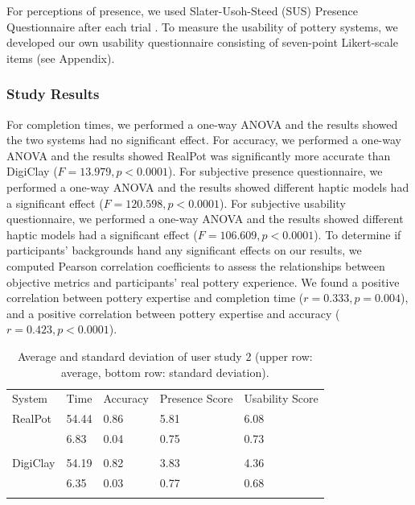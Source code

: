 \documentclass{svjour3}                     %
\begin{document}
{For perceptions of presence, we used Slater-Usoh-Steed (SUS) Presence Questionnaire after each trial \cite{slater1994depth}.
To measure the usability of pottery systems, we developed our own usability questionnaire consisting of seven-point Likert-scale items (see Appendix).


\subsubsection{Study Results}

For completion times, we performed a one-way ANOVA and the results showed the two systems had no significant effect.
For accuracy, we performed a one-way ANOVA and the results showed RealPot was significantly more accurate than DigiClay ($F = 13.979, p < 0.0001$). 
For subjective presence questionnaire, we performed a one-way ANOVA and the results showed different haptic models had a significant effect ($F = 120.598, p < 0.0001$).
For subjective usability questionnaire, we performed a one-way ANOVA and the results showed different haptic models had a significant effect ($F = 106.609, p < 0.0001$).
To determine if participants' backgrounds hand any significant effects on our results, we computed Pearson correlation coefficients to assess the relationships between objective metrics and participants' real pottery experience. We found a positive correlation between pottery expertise and completion time ($r = 0.333, p = 0.004$), and a positive correlation between pottery expertise and accuracy ($r = 0.423, p < 0.0001$).

\begin{table}
\caption{Average and standard deviation of user study 2 (upper row: average, bottom row: standard deviation).}
\label{tab:r2}       %
\begin{tabular}{lllll}
\hline\noalign{\smallskip}
System & Time & Accuracy & Presence Score & Usability Score\\
\noalign{\smallskip}\hline\noalign{\smallskip}
RealPot 	& 54.44	& 0.86 & 5.81 & 6.08 \\
			& 6.83	& 0.04 & 0.75 & 0.73 \\
\\
DigiClay 	& 54.19	& 0.82 & 3.83 & 4.36 \\
			& 6.35	& 0.03 & 0.77 & 0.68 \\
\noalign{\smallskip}\hline
\end{tabular}
\end{table}

}
\end{document}
